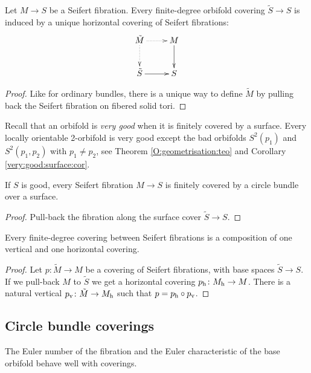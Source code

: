 \begin{prop} \label{horizontal:prop}
Let $M\to S$ be a Seifert fibration. Every finite-degree orbifold covering $\tilde S \to S$ is induced by a unique horizontal covering of Seifert fibrations:
$$
\xymatrix{ 
\tilde M\ar@{.>}[r] \ar@{.>}[d] & M \ar[d] \\
\tilde S\ar[r] & S
}
$$
\end{prop}
\begin{proof}
Like for ordinary bundles, there is a unique way to define $\tilde M$ by pulling back the Seifert fibration on fibered solid tori.
\end{proof}

Recall that an orbifold is \emph{very good} when it is finitely covered by a surface. Every locally orientable 2-orbifold is very good except the bad orbifolds $S^2(p_1)$ and $S^2(p_1,p_2)$ with $p_1\neq p_2$, see Theorem \ref{O:geometrisation:teo} and Corollary \ref{very:good:surface:cor}.

\begin{cor} \label{good:bundle:cor}
If $S$ is good, every Seifert fibration $M\to S$ is finitely covered by a circle bundle over a surface.
\end{cor}
\begin{proof}
Pull-back the fibration along the surface cover $\tilde S \to S$.
\end{proof}

\begin{prop} \label{hv:prop}
Every finite-degree covering between Seifert fibrations is a composition of one vertical and one horizontal covering. 
\end{prop}
\begin{proof}
Let $p\colon \tilde M\to M$ be a covering of Seifert fibrations, with base spaces $\tilde S \to S$. If we pull-back $M$ to $\tilde S$ we get a horizontal covering $p_{\rm h}\colon M_{\rm h} \to M$. There is a natural vertical $p_{\rm v}\colon \tilde M \to M_{\rm h}$ such that $p = p_{\rm h} \circ p_{\rm v}$.
\end{proof}

\subsection{Circle bundle coverings}
The Euler number of the fibration and the Euler characteristic of the base orbifold behave well with coverings.


